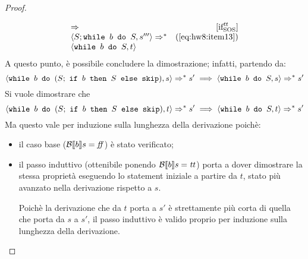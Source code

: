 \begin{proof}
\begin{itemize}
$$\begin{array}{lr}
      \Rightarrow^{ } &  [ \textrm{\normalfont{if}} ^ \textrm{\normalfont{\ensuremath{\mbox{\textit{tt}}}}} _\textrm{\normalfont{SOS}} ] \\
  \langle{}S;\mbox{\normalfont{\texttt{while }}} b \textrm{\normalfont{\texttt{ do }}} S, s'''\rangle{} \Rightarrow^{*} & (\text{\ref{eq:hw8:item13}}) \\
  \langle{}\mbox{\normalfont{\texttt{while }}} b \textrm{\normalfont{\texttt{ do }}} S, t\rangle{}
  \end{array}
  $$
  A questo punto, è possibile concludere la dimostrazione; infatti, partendo
  da:
  $$
  \confSs{\wbS{b}{(S;\ \ifABC{b}{S}{\skipForFriends})}}{s} \Rar{*} s'
  \implies
  \confSs{\wbS{b}{S}}{s} \Rar{*} s'
  $$
  Si vuole dimostrare che
  $$
  \confSs{\wbS{b}{(S;\ \ifABC{b}{S}{\skipForFriends})}}{t} \Rar{*} s'
  \implies
  \confSs{\wbS{b}{S}}{t} \Rar{*} s'
  $$
  Ma questo vale per induzione sulla lunghezza della derivazione poichè:
  \begin{itemize}
    \item il caso base ($\mathcal{B} \llbracket b \rrbracket s = \mbox{\textit{ff}}$) è stato verificato;
    \item il passo induttivo (ottenibile ponendo $\mathcal{B} \llbracket b \rrbracket s = \mbox{\textit{tt}}$) porta a
      dover dimostrare la stessa proprietà eseguendo lo statement iniziale a
      partire da $t$, stato più avanzato nella derivazione rispetto a $s$.

      Poichè la derivazione che da $t$ porta a $s'$ è strettamente più corta di
      quella che porta da $s$ a $s'$, il passo induttivo è valido proprio per
      induzione sulla lunghezza della derivazione.
  \end{itemize}
\end{itemize}

\end{proof}

